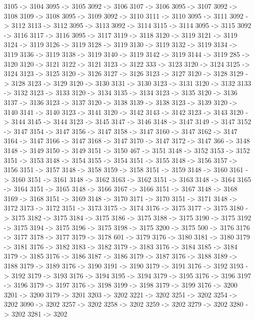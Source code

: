 {	3105 -> 3104
	3095 -> 3105
	3092 -> 3106
	3107 -> 3106
	3095 -> 3107
	3092 -> 3108
	3109 -> 3108
	3095 -> 3109
	3092 -> 3110
	3111 -> 3110
	3095 -> 3111
	3092 -> 3112
	3113 -> 3112
	3095 -> 3113
	3092 -> 3114
	3115 -> 3114
	3095 -> 3115
	3092 -> 3116
	3117 -> 3116
	3095 -> 3117
	3119 -> 3118
	3120 -> 3119
	3121 -> 3119
	3124 -> 3119
	3126 -> 3119
	3128 -> 3119
	3130 -> 3119
	3132 -> 3119
	3134 -> 3119
	3136 -> 3119
	3138 -> 3119
	3140 -> 3119
	3142 -> 3119
	3144 -> 3119
	285 -> 3120
	3120 -> 3121
	3122 -> 3121
	3123 -> 3122
	333 -> 3123
	3120 -> 3124
	3125 -> 3124
	3123 -> 3125
	3120 -> 3126
	3127 -> 3126
	3123 -> 3127
	3120 -> 3128
	3129 -> 3128
	3123 -> 3129
	3120 -> 3130
	3131 -> 3130
	3123 -> 3131
	3120 -> 3132
	3133 -> 3132
	3123 -> 3133
	3120 -> 3134
	3135 -> 3134
	3123 -> 3135
	3120 -> 3136
	3137 -> 3136
	3123 -> 3137
	3120 -> 3138
	3139 -> 3138
	3123 -> 3139
	3120 -> 3140
	3141 -> 3140
	3123 -> 3141
	3120 -> 3142
	3143 -> 3142
	3123 -> 3143
	3120 -> 3144
	3145 -> 3144
	3123 -> 3145
	3147 -> 3146
	3148 -> 3147
	3149 -> 3147
	3152 -> 3147
	3154 -> 3147
	3156 -> 3147
	3158 -> 3147
	3160 -> 3147
	3162 -> 3147
	3164 -> 3147
	3166 -> 3147
	3168 -> 3147
	3170 -> 3147
	3172 -> 3147
	366 -> 3148
	3148 -> 3149
	3150 -> 3149
	3151 -> 3150
	467 -> 3151
	3148 -> 3152
	3153 -> 3152
	3151 -> 3153
	3148 -> 3154
	3155 -> 3154
	3151 -> 3155
	3148 -> 3156
	3157 -> 3156
	3151 -> 3157
	3148 -> 3158
	3159 -> 3158
	3151 -> 3159
	3148 -> 3160
	3161 -> 3160
	3151 -> 3161
	3148 -> 3162
	3163 -> 3162
	3151 -> 3163
	3148 -> 3164
	3165 -> 3164
	3151 -> 3165
	3148 -> 3166
	3167 -> 3166
	3151 -> 3167
	3148 -> 3168
	3169 -> 3168
	3151 -> 3169
	3148 -> 3170
	3171 -> 3170
	3151 -> 3171
	3148 -> 3172
	3173 -> 3172
	3151 -> 3173
	3175 -> 3174
	3176 -> 3175
	3177 -> 3175
	3180 -> 3175
	3182 -> 3175
	3184 -> 3175
	3186 -> 3175
	3188 -> 3175
	3190 -> 3175
	3192 -> 3175
	3194 -> 3175
	3196 -> 3175
	3198 -> 3175
	3200 -> 3175
	500 -> 3176
	3176 -> 3177
	3178 -> 3177
	3179 -> 3178
	601 -> 3179
	3176 -> 3180
	3181 -> 3180
	3179 -> 3181
	3176 -> 3182
	3183 -> 3182
	3179 -> 3183
	3176 -> 3184
	3185 -> 3184
	3179 -> 3185
	3176 -> 3186
	3187 -> 3186
	3179 -> 3187
	3176 -> 3188
	3189 -> 3188
	3179 -> 3189
	3176 -> 3190
	3191 -> 3190
	3179 -> 3191
	3176 -> 3192
	3193 -> 3192
	3179 -> 3193
	3176 -> 3194
	3195 -> 3194
	3179 -> 3195
	3176 -> 3196
	3197 -> 3196
	3179 -> 3197
	3176 -> 3198
	3199 -> 3198
	3179 -> 3199
	3176 -> 3200
	3201 -> 3200
	3179 -> 3201
	3203 -> 3202
	3221 -> 3202
	3251 -> 3202
	3254 -> 3202
	3090 -> 3202
	3257 -> 3202
	3258 -> 3202
	3259 -> 3202
	3279 -> 3202
	3280 -> 3202
	3281 -> 3202
}
